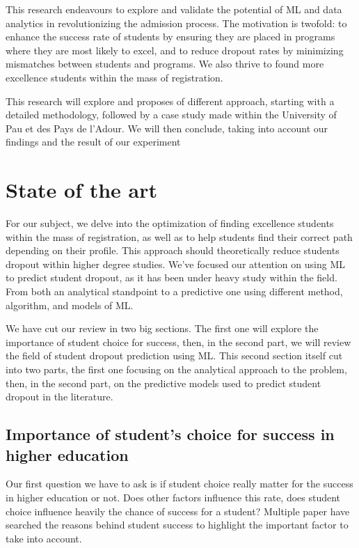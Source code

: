 \documentclass[conference]{IEEEtran}
\begin{document}
This research endeavours to explore and validate the potential of ML and data analytics in revolutionizing the admission process. The motivation is twofold: to enhance the success rate of students by ensuring they are placed in programs where they are most likely to excel, and to reduce dropout rates by minimizing mismatches between students and programs. We also thrive to found more excellence students within the mass of registration.

This research will explore and proposes of different approach, starting with a detailed methodology, followed by a case study made within the University of Pau et des Pays de l'Adour. 
We will then conclude, taking into account our findings and the result of our experiment 

\section{State of the art}
\label{sec:soa}
For our subject, we delve into the optimization of finding excellence students within the mass of registration, as well as to help students find their correct path depending on their profile. This approach should theoretically reduce students dropout within higher degree studies.
We've focused our attention on using ML to predict student dropout, as it has been under heavy study within the field. From both an analytical standpoint to a predictive one using different method, algorithm, and models of ML.

We have cut our review in two big sections. The first one will explore the importance of student choice for success, then, in the second part, we will review the field of student dropout prediction using ML. This second section itself cut into two parts, the first one focusing on the analytical approach to the problem, then, in the second part, on the predictive models used to predict student dropout in the literature.

\subsection{Importance of student's choice for success in higher education}
Our first question we have to ask is if student choice really matter for the success in higher education or not. Does other factors influence this rate, does student choice influence heavily the chance of success for a student?
Multiple paper have searched the reasons behind student success to highlight the important factor to take into account.
\end{document}
